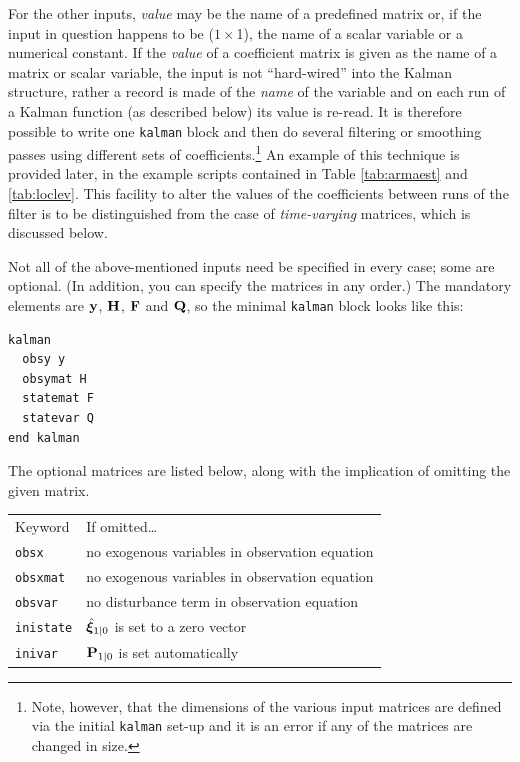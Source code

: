 \documentclass[a4paper]{article}
\newcommand{\obsvec}{\ensuremath\mathbf{y}}
\newcommand{\obsmat}{\ensuremath\mathbf{H}}
\newcommand{\statevec}{\ensuremath\mathbf{\bm \xi}}
\newcommand{\statemat}{\ensuremath\mathbf{F}}
\newcommand{\strvar}{\ensuremath\mathbf{Q}}
\newcommand{\statevar}{\ensuremath\mathbf{P}}
\begin{document}
For the other inputs, \textsl{value} may be the name of a predefined
matrix or, if the input in question happens to be ($1 \times $1), the
name of a scalar variable or a numerical constant.  If the
\textsl{value} of a coefficient matrix is given as the name of a
matrix or scalar variable, the input is not ``hard-wired'' into the
Kalman structure, rather a record is made of the \textit{name} of the
variable and on each run of a Kalman function (as described below) its
value is re-read.  It is therefore possible to write one
\texttt{kalman} block and then do several filtering or smoothing
passes using different sets of coefficients.\footnote{Note, however,
  that the dimensions of the various input matrices are defined via
  the initial \texttt{kalman} set-up and it is an error if any of the
  matrices are changed in size.}  An example of this technique is
provided later, in the example scripts contained in Table
\ref{tab:armaest} and \ref{tab:loclev}.  This facility to alter the
values of the coefficients between runs of the filter is to be
distinguished from the case of \emph{time-varying} matrices, which is
discussed below.

Not all of the above-mentioned inputs need be specified in every case;
some are optional. (In addition, you can specify the matrices in any
order.)  The mandatory elements are $\obsvec$, $\obsmat$, $\statemat$
and $\strvar$, so the minimal \texttt{kalman} block looks like this:

\begin{verbatim}
kalman 
  obsy y
  obsymat H
  statemat F
  statevar Q
end kalman
\end{verbatim} 

The optional matrices are listed below, along with the implication
of omitting the given matrix.

\begin{center}
\begin{tabular}{ll}
Keyword & If omitted\dots \\ [6pt]
\texttt{obsx} & no exogenous variables in observation equation\\
\texttt{obsxmat} & no exogenous variables in observation equation\\
\texttt{obsvar} & no disturbance term in observation equation\\
\texttt{inistate} & $\hat{\statevec}_{1|0}$ is set to a zero vector\\
\texttt{inivar} & $\statevar_{1|0}$ is set automatically\\
\end{tabular}
\end{center}
\end{document}
